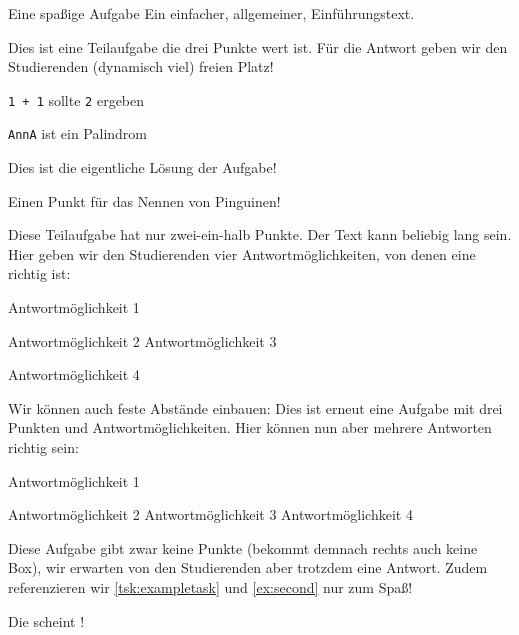 \begin{task}[8.5]{Eine spaßige Aufgabe}
Ein einfacher, allgemeiner, Einführungstext.

\begin{subtasks}
    Dies ist eine Teilaufgabe die drei Punkte wert ist. Für die Antwort geben wir den Studierenden (dynamisch viel) freien Platz!
   \begin{examples}
      \item \texttt{1 + 1} sollte \texttt{2} ergeben
      \item \texttt{AnnA} ist ein Palindrom
   \end{examples}

   \VerticalSpace
   \begin{solution}
      Dies ist die eigentliche Lösung der Aufgabe!
   \end{solution}
   \begin{correction}
      Einen Punkt für das Nennen von Pinguinen!
   \end{correction}
    \label{tsk:exampletask}Diese Teilaufgabe hat nur zwei-ein-halb Punkte. Der Text kann beliebig lang sein. Hier geben wir den Studierenden vier Antwortmöglichkeiten, von denen eine richtig ist:
   \begin{radioboxes}
      \item    Antwortmöglichkeit 1
      \item    Antwortmöglichkeit 2
      \correct Antwortmöglichkeit 3
      \item    Antwortmöglichkeit 4
   \end{radioboxes}
   Wir können auch feste Abstände einbauen:
   \VerticalSpace[2cm]
    Dies ist erneut eine Aufgabe mit drei Punkten und Antwortmöglichkeiten. Hier können nun aber mehrere Antworten richtig sein:
   \begin{checkboxes}
      \correct Antwortmöglichkeit 1
      \item    Antwortmöglichkeit 2
      \correct Antwortmöglichkeit 3
      \correct Antwortmöglichkeit 4
   \end{checkboxes}
    Diese Aufgabe gibt zwar keine Punkte (bekommt demnach rechts auch keine Box), wir erwarten von den Studierenden aber trotzdem eine Antwort. Zudem referenzieren wir \autoref{tsk:exampletask} und \autoref{ex:second} nur zum Spaß!

   Die  scheint !
   \qquad\strut
\end{subtasks}
\end{task}